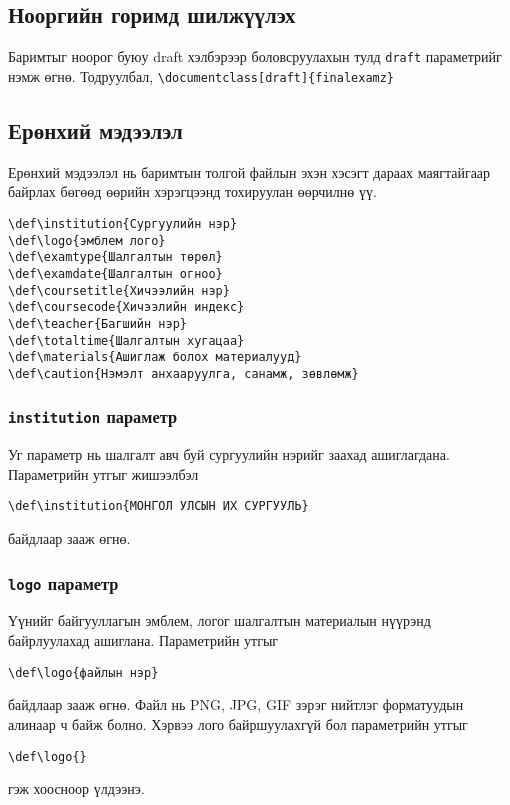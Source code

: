 \documentclass[10pt]{article}
\theoremstyle{definition}
\begin{document}
\subsection{Нооргийн горимд шилжүүлэх}

Баримтыг ноорог буюу draft хэлбэрээр боловсруулахын тулд \texttt{draft} параметрийг нэмж өгнө. Тодруулбал, \verb|\documentclass[draft]{finalexamz}|

\subsection{Ерөнхий мэдээлэл}

Ерөнхий мэдээлэл нь баримтын толгой файлын эхэн хэсэгт дараах маягтайгаар байрлах бөгөөд өөрийн хэрэгцээнд тохируулан өөрчилнө үү.
\begin{verbatim}
\def\institution{Сургуулийн нэр}
\def\logo{эмблем лого}
\def\examtype{Шалгалтын төрөл}
\def\examdate{Шалгалтын огноо}
\def\coursetitle{Хичээлийн нэр}
\def\coursecode{Хичээлийн индекс}
\def\teacher{Багшийн нэр}
\def\totaltime{Шалгалтын хугацаа}
\def\materials{Ашиглаж болох материалууд}
\def\caution{Нэмэлт анхааруулга, санамж, зөвлөмж}
\end{verbatim}

\subsubsection{\texttt{institution} параметр}

Уг параметр нь шалгалт авч буй сургуулийн нэрийг заахад ашиглагдана. Параметрийн утгыг жишээлбэл 
\begin{verbatim}
\def\institution{МОНГОЛ УЛСЫН ИХ СУРГУУЛЬ}
\end{verbatim}
байдлаар зааж өгнө.

\subsubsection{\texttt{logo} параметр}

Үүнийг байгууллагын эмблем, логог шалгалтын материалын нүүрэнд  байрлуулахад ашиглана. Параметрийн утгыг 
\begin{verbatim}
\def\logo{файлын нэр}
\end{verbatim}
байдлаар зааж өгнө. Файл нь PNG, JPG, GIF зэрэг нийтлэг форматуудын алинаар ч байж болно. Хэрвээ лого байршуулахгүй бол параметрийн утгыг 
\begin{verbatim}
\def\logo{}
\end{verbatim}
гэж хоосноор үлдээнэ.
\end{document}
